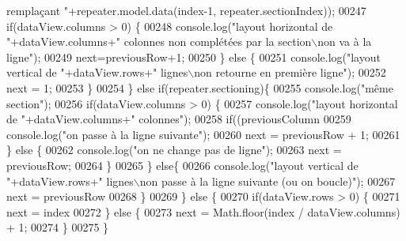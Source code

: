\begin{DoxyCode}
{{       remplaçant "}+repeater.model.data(index-1, repeater.sectionIndex));
00247                         \textcolor{keywordflow}{if}(dataView.columns > 0) \{
00248                             console.log(\textcolor{stringliteral}{"layout horizontal de "}+dataView.columns+\textcolor{stringliteral}{" colonnes non complétées
       par la section\(\backslash\)non va à la ligne"});
00249                             next=previousRow+1;
00250                         \} \textcolor{keywordflow}{else} \{
00251                             console.log(\textcolor{stringliteral}{"layout vertical de "}+dataView.rows+\textcolor{stringliteral}{" lignes\(\backslash\)non retourne en
       première ligne"});
00252                             next = 1;
00253                         \}
00254                     \} \textcolor{keywordflow}{else} \textcolor{keywordflow}{if}(repeater.sectioning)\{
00255                         console.log(\textcolor{stringliteral}{"même section"});
00256                         \textcolor{keywordflow}{if}(dataView.columns > 0) \{
00257                             console.log(\textcolor{stringliteral}{"layout horizontal de "}+dataView.columns+\textcolor{stringliteral}{" colonnes"});
00258                             \textcolor{keywordflow}{if}((previousColumn %
00259                                 console.log(\textcolor{stringliteral}{"on passe à la ligne suivante"});
00260                                 next = previousRow + 1;
00261                             \} \textcolor{keywordflow}{else} \{
00262                                 console.log(\textcolor{stringliteral}{"on ne change pas de ligne"});
00263                                 next = previousRow;
00264                             \}
00265                         \} \textcolor{keywordflow}{else}\{
00266                             console.log(\textcolor{stringliteral}{"layout vertical de "}+dataView.rows+\textcolor{stringliteral}{" lignes\(\backslash\)non passe à la ligne
       suivante (ou on boucle)"});
00267                             next = previousRow %
00268                         \}
00269                     \} \textcolor{keywordflow}{else} \{
00270                         \textcolor{keywordflow}{if}(dataView.rows > 0) \{
00271                             next = index %
00272                         \} \textcolor{keywordflow}{else} \{
00273                             next = Math.floor(index / dataView.columns) + 1;
00274                         \}
00275                     \}
}
\end{DoxyCode}
